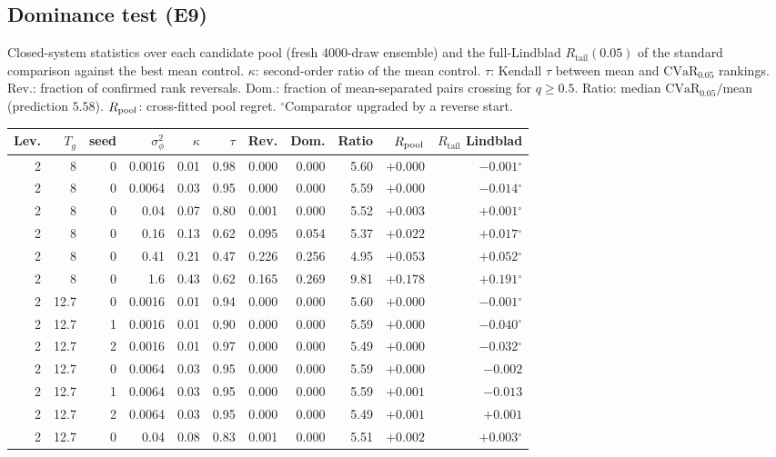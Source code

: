 \documentclass[aps,pra,onecolumn,notitlepage,superscriptaddress,nofootinbib,floatfix]{revtex4-2}
\newcommand{\cvar}{\mathrm{CVaR}}
\newcommand{\Rt}{R_{\mathrm{tail}}}
\begin{document}
\subsection{Dominance test (E9)}
Closed-system statistics over each candidate pool (fresh 4000-draw ensemble)
and the full-Lindblad $\Rt(0.05)$ of the standard comparison against the best
mean control. $\kappa$: second-order ratio of the mean control. $\tau$:
Kendall $\tau$ between mean and $\cvar_{0.05}$ rankings. Rev.: fraction of
confirmed rank reversals. Dom.: fraction of mean-separated pairs crossing for
$q\ge0.5$. Ratio: median $\cvar_{0.05}/$mean (prediction $5.58$).
$R_{\rm pool}$: cross-fitted pool regret. $^{\circ}$Comparator upgraded by a
reverse start.
{\scriptsize\setlength{\tabcolsep}{3pt}
\begin{longtable}{@{}rrrrrrrrrrr@{}}
\toprule
Lev. & $T_g$ & seed & $\sigma_\phi^2$ & $\kappa$ & $\tau$ & Rev. & Dom. & Ratio & $R_{\rm pool}$ & $\Rt$ Lindblad\\
\midrule
\endhead
2 & 8 & 0 & 0.0016 & 0.01 & 0.98 & 0.000 & 0.000 & 5.60 & $+0.000$ & $-0.001$$^{\circ}$ \\
2 & 8 & 0 & 0.0064 & 0.03 & 0.95 & 0.000 & 0.000 & 5.59 & $+0.000$ & $-0.014$$^{\circ}$ \\
2 & 8 & 0 & 0.04 & 0.07 & 0.80 & 0.001 & 0.000 & 5.52 & $+0.003$ & $+0.001$$^{\circ}$ \\
2 & 8 & 0 & 0.16 & 0.13 & 0.62 & 0.095 & 0.054 & 5.37 & $+0.022$ & $+0.017$$^{\circ}$ \\
2 & 8 & 0 & 0.41 & 0.21 & 0.47 & 0.226 & 0.256 & 4.95 & $+0.053$ & $+0.052$$^{\circ}$ \\
2 & 8 & 0 & 1.6 & 0.43 & 0.62 & 0.165 & 0.269 & 9.81 & $+0.178$ & $+0.191$$^{\circ}$ \\
2 & 12.7 & 0 & 0.0016 & 0.01 & 0.94 & 0.000 & 0.000 & 5.60 & $+0.000$ & $-0.001$$^{\circ}$ \\
2 & 12.7 & 1 & 0.0016 & 0.01 & 0.90 & 0.000 & 0.000 & 5.59 & $+0.000$ & $-0.040$$^{\circ}$ \\
2 & 12.7 & 2 & 0.0016 & 0.01 & 0.97 & 0.000 & 0.000 & 5.49 & $+0.000$ & $-0.032$$^{\circ}$ \\
2 & 12.7 & 0 & 0.0064 & 0.03 & 0.95 & 0.000 & 0.000 & 5.59 & $+0.000$ & $-0.002$ \\
2 & 12.7 & 1 & 0.0064 & 0.03 & 0.95 & 0.000 & 0.000 & 5.59 & $+0.001$ & $-0.013$ \\
2 & 12.7 & 2 & 0.0064 & 0.03 & 0.95 & 0.000 & 0.000 & 5.49 & $+0.001$ & $+0.001$ \\
2 & 12.7 & 0 & 0.04 & 0.08 & 0.83 & 0.001 & 0.000 & 5.51 & $+0.002$ & $+0.003$$^{\circ}$ \\

\end{longtable}}
\end{document}
